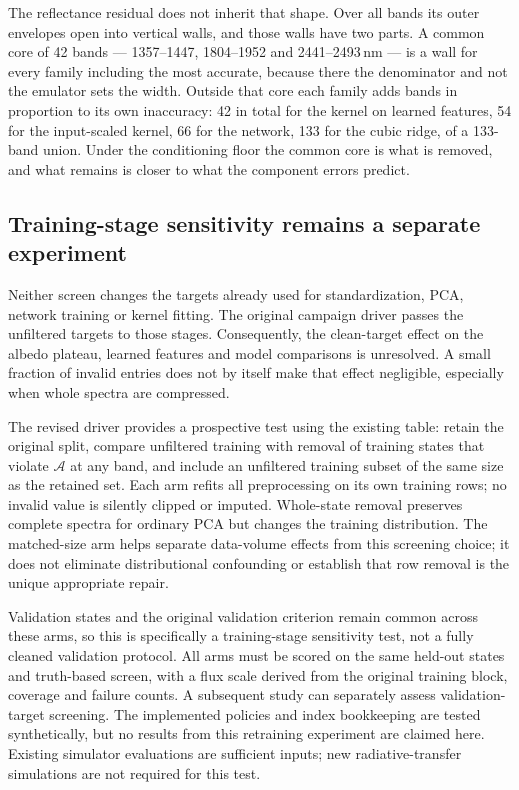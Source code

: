 The reflectance residual does not inherit that shape. Over all bands its outer envelopes
open into vertical walls, and those walls have two parts. A common core of 42 bands ---
1357--1447, 1804--1952 and 2441--2493\,nm --- is a wall for every family including the
most accurate, because there the denominator and not the emulator sets the width. Outside
that core each family adds bands in proportion to its own inaccuracy: 42 in total for the
kernel on learned features, 54 for the input-scaled kernel, 66 for the network, 133 for the
cubic ridge, of a 133-band union. Under the conditioning floor the common core is what is
removed, and what remains is closer to what the component errors predict.

\subsection{Training-stage sensitivity remains a separate experiment}
Neither screen changes the targets already used for standardization, PCA, network
training or kernel fitting. The original campaign driver passes the unfiltered targets
to those stages. Consequently, the clean-target effect on the albedo plateau, learned
features and model comparisons is unresolved. A small fraction of invalid entries does
not by itself make that effect negligible, especially when whole spectra are compressed.

The revised driver provides a prospective test using the existing table: retain the
original split, compare unfiltered training with removal of training states that violate
$\mathcal A$ at any band, and include an unfiltered training subset of the same size as
the retained set. Each arm refits all preprocessing on its own training rows; no invalid
value is silently clipped or imputed. Whole-state removal preserves complete spectra for
ordinary PCA but changes the training distribution. The matched-size arm helps separate
data-volume effects from this screening choice; it does not eliminate distributional
confounding or establish that row removal is the unique appropriate repair.

Validation states and the original validation criterion remain common across these
arms, so this is specifically a training-stage sensitivity test, not a fully cleaned
validation protocol. All arms must be scored on the same held-out states and truth-based
screen, with a flux scale derived from the original training block, coverage and failure
counts. A subsequent study can separately assess validation-target screening. The
implemented policies and index bookkeeping are tested synthetically, but no results
from this retraining experiment are claimed here. Existing simulator evaluations are
sufficient inputs; new radiative-transfer simulations are not required for this test.

